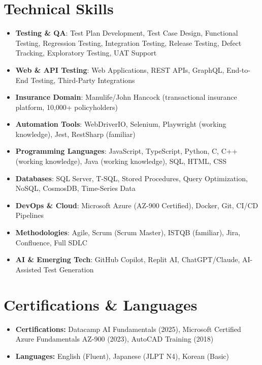 \documentclass[letterpaper,11pt]{article}
\newcommand{\resumeSubHeadingListStart}{\begin{itemize}[leftmargin=*]}
\newcommand{\resumeSubHeadingListEnd}{\end{itemize}}
\begin{document}
\section{Technical Skills}
 \resumeSubHeadingListStart
   \item{
     \textbf{Testing \& QA}{: Test Plan Development, Test Case Design, Functional Testing, Regression Testing, Integration Testing, Release Testing, Defect Tracking, Exploratory Testing, UAT Support}
   }
   \item{
     \textbf{Web \& API Testing}{: Web Applications, REST APIs, GraphQL, End-to-End Testing, Third-Party Integrations}
   }
   \item{
     \textbf{Insurance Domain}{: Manulife/John Hancock (transactional insurance platform, 10,000+ policyholders)}
   }
   \item{
     \textbf{Automation Tools}{: WebDriverIO, Selenium, Playwright (working knowledge), Jest, RestSharp (familiar)}
   }
   \item{
     \textbf{Programming Languages}{: JavaScript, TypeScript, Python, C, C++ (working knowledge), Java (working knowledge), SQL, HTML, CSS}
   }
   \item{
     \textbf{Databases}{: SQL Server, T-SQL, Stored Procedures, Query Optimization, NoSQL, CosmosDB, Time-Series Data}
   }
   \item{
     \textbf{DevOps \& Cloud}{: Microsoft Azure (AZ-900 Certified), Docker, Git, CI/CD Pipelines}
   }
   \item{
     \textbf{Methodologies}{: Agile, Scrum (Scrum Master), ISTQB (familiar), Jira, Confluence, Full SDLC}
   }
   \item{
     \textbf{AI \& Emerging Tech}{: GitHub Copilot, Replit AI, ChatGPT/Claude, AI-Assisted Test Generation}
   }
 \resumeSubHeadingListEnd

\section{Certifications \& Languages}
  \resumeSubHeadingListStart
    \item{
      \textbf{Certifications: } Datacamp AI Fundamentals (2025), Microsoft Certified Azure Fundamentals AZ-900 (2023), AutoCAD Training (2018)
    }
    \item{
      \textbf{Languages: } English (Fluent), Japanese (JLPT N4), Korean (Basic)
    }
  \resumeSubHeadingListEnd
\end{document}
